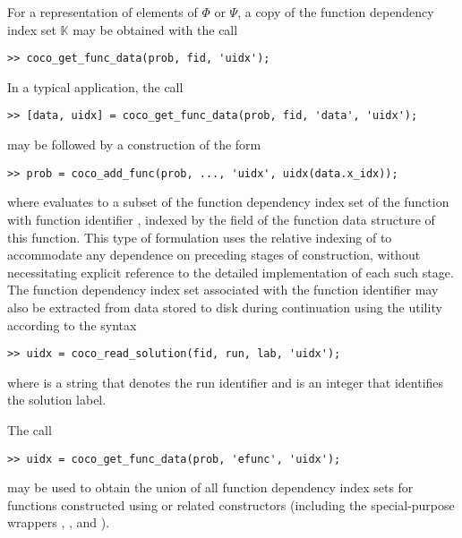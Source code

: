 For a representation of elements of $\Phi$ or $\Psi$, a copy of the function dependency index set $\mathbb{K}$ may be obtained with the call
 \begin{lstlisting}[language=coco-highlight]
 >> coco_get_func_data(prob, fid, 'uidx');
\end{lstlisting}
In a typical application, the call
\begin{lstlisting}[language=coco-highlight]
 >> [data, uidx] = coco_get_func_data(prob, fid, 'data', 'uidx');
\end{lstlisting}
may be followed by a construction of the form
 \begin{lstlisting}[language=coco-highlight]
 >> prob = coco_add_func(prob, ..., 'uidx', uidx(data.x_idx));
\end{lstlisting}
where  evaluates to a subset of the function dependency index set of the function with function identifier , indexed by the  field of the function data structure of this function. This type of formulation uses the relative indexing of  to accommodate any dependence on preceding stages of construction, without necessitating explicit reference to the detailed implementation of each such stage. The function dependency index set associated with the function identifier  may also be extracted from data stored to disk during continuation using the  utility according to the syntax
\begin{lstlisting}[language=coco-highlight]
>> uidx = coco_read_solution(fid, run, lab, 'uidx');
\end{lstlisting}
where  is a string that denotes the run identifier and  is an integer that identifies the solution label.

The call 
\begin{lstlisting}[language=coco-highlight]
 >> uidx = coco_get_func_data(prob, 'efunc', 'uidx');
\end{lstlisting}
may be used to obtain the union of all function dependency index sets for functions constructed using  or related constructors (including the special-purpose wrappers , , and ).



